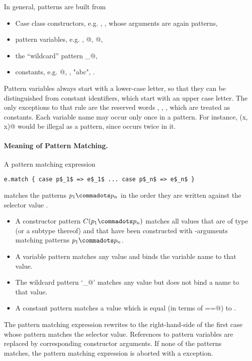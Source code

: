 \documentclass[11pt]{book}
\begin{document}
In general, patterns are built from
\begin{itemize}
\item Case class constructors, e.g. \verb@Number@, \verb@Sum@, whose arguments
      are again patterns,
\item pattern variables, e.g. \verb@n@, @, @,
\item the ``wildcard'' pattern \verb@_@,
\item constants, e.g. @, \verb@true@, "abc", \verb@MAXINT@.
\end{itemize}
Pattern variables always start with a lower-case letter, so that they
can be distinguished from constant identifiers, which start with an
upper case letter. The only exceptions to that rule are the reserved
words \verb@null@, \verb@true@, \verb@false@, which are treated as constants.
Each variable name may occur only once in a pattern. For instance,
\verb@Sum(x, x)@ would be illegal as a pattern, since \verb@x@ occurs
twice in it.

\paragraph{Meaning of Pattern Matching.}
A pattern matching expression 
\begin{verbatim}
e.match { case p$_1$ => e$_1$ ... case p$_n$ => e$_n$ }
\end{verbatim}
matches the patterns $p_1 \commadots p_n$ in the order they
are written against the selector value \verb@e@.
\begin{itemize}
\item
A constructor pattern $C(p_1 \commadots p_n)$ matches all values that
are of type \verb@C@ (or a subtype thereof) and that have been constructed with 
\verb@C@-arguments matching patterns $p_1 \commadots p_n$.
\item 
A variable pattern \verb@x@ matches any value and binds the variable
name to that value.  
\item 
The wildcard pattern `\verb@_@' matches any value but does not bind a name to that value. 
\item A constant pattern \verb@C@ matches a value which is
equal (in terms of \verb@==@) to \verb@C@.
\end{itemize}
The pattern matching expression rewrites to the right-hand-side of the
first case whose pattern matches the selector value. References to
pattern variables are replaced by corresponding constructor arguments.
If none of the patterns matches, the pattern matching expression is
aborted with a \verb@MatchError@ exception.
\end{document}
